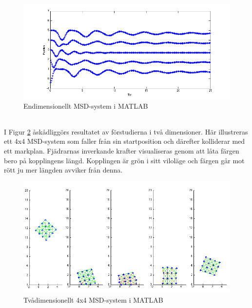 \documentclass[a4paper,12pt,oneside,final,swedish]{extarticle}
\begin{document}
\begin{figure}[h!]
  \begin{center}
    \includegraphics[width=16cm]{Bilder/1D_matlab.png} 
  \end{center}
  \caption{Endimensionellt MSD-system i MATLAB}
  \label{endim::nonfloat}
\end{figure}

\noindent \\I Figur \ref{tvådim::nonfloat} åskådliggörs resultatet av förstudierna i två dimensioner. Här illustreras ett 4x4 MSD-system som faller från sin startposition och därefter kolliderar med ett markplan.
Fjädrarnas inverkande krafter visualiseras genom att låta färgen bero på kopplingens längd. 
Kopplingen är grön i sitt viloläge och färgen går mot rött ju mer längden avviker från denna.

\begin{figure}[h!]
  \begin{center}
    \includegraphics[width=16cm]{Bilder/boing.png} 
  \end{center}
  \caption{Tvådimensionellt 4x4 MSD-system i MATLAB}
  \label{tvådim::nonfloat}
\end{figure}
\end{document}
